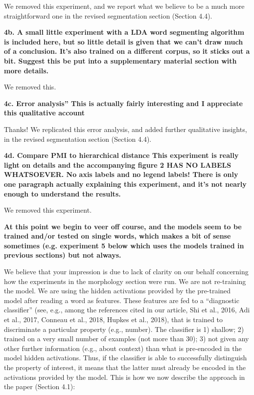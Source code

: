 \documentclass{article}
\begin{document}
We removed this experiment, and we report what we believe to be a much more straightforward one in the revised segmentation section (Section 4.4).
\newline

\textbf{4b. A small little experiment with a LDA word segmenting algorithm is included here, but so little detail is given that we can't draw much of a conclusion.  It's also trained on a different corpus, so it sticks out a bit.  Suggest this be put into a supplementary material section with more details.}

We removed this.
\newline

\textbf{4c. Error analysis'' This is actually fairly interesting and I appreciate this qualitative account}

Thanks! We replicated this error analysis, and added further qualitative insights, in the revised segmentation section (Section 4.4).
\newline

\textbf{4d. Compare PMI to hierarchical distance This experiment is really light on details and the accompanying figure 2 HAS NO LABELS WHATSOEVER.  No axis labels and no legend labels!  There is only one paragraph actually explaining this experiment, and it's not nearly enough to understand the results.}

We removed this experiment.
\newline

\textbf{At this point we begin to veer off course, and the models seem to be trained and/or tested on single words, which makes a bit of sense sometimes (e.g. experiment 5 below which uses the models trained in previous sections) but not always.}

We believe that your impression is due to lack of clarity on our behalf concerning how the experiments in the morphology section were run. We are not re-training the model. We are using the hidden activations provided by the pre-trained model after reading a word as features. These features are fed to a ``diagnostic classifier'' (see, e.g., among the references cited in our article, Shi et al., 2016, Adi et al., 2017, Conneau et al., 2018, Hupkes et al., 2018), that is trained to discriminate a particular property (e.g., number). The classifier is 1) shallow; 2) trained on a very small number of examples (not more than 30); 3) not given any other further information (e.g., about context) than what is pre-encoded in the model hidden activations. Thus, if the classifier is able to successfully distinguish the property of interest, it means that the latter must already be encoded in the activations provided by the model. This is how we now describe the approach in the paper (Section 4.1):
\end{document}
